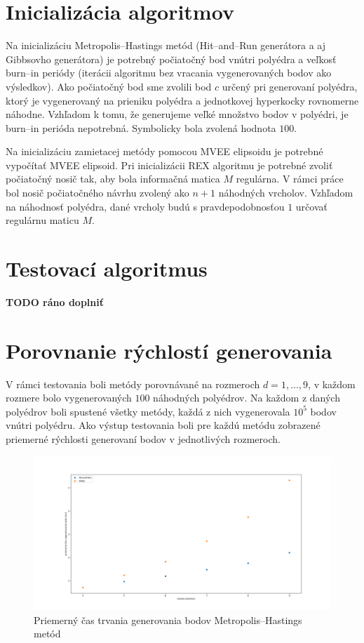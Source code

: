 \section{Inicializácia algoritmov}

Na inicializáciu Metropolis--Hastings metód (Hit--and--Run generátora a aj Gibbsovho generátora) je potrebný počiatočný bod vnútri polyédra a veľkosť burn--in periódy (iterácii algoritmu bez vracania vygenerovaných bodov ako výsledkov). Ako počiatočný bod sme zvolili bod $c$ určený pri generovaní polyédra, ktorý je vygenerovaný na prieniku polyédra a jednotkovej hyperkocky rovnomerne náhodne. Vzhľadom k tomu, že generujeme veľké množstvo bodov v polyédri, je burn--in perióda nepotrebná. Symbolicky bola zvolená hodnota $100$.

Na inicializáciu zamietacej metódy pomocou MVEE elipsoidu je potrebné vypočítať MVEE elipsoid. Pri inicializácii REX algoritmu je potrebné zvoliť počiatočný nosič tak, aby bola informačná matica $M$ regulárna. V rámci práce bol nosič počiatočného návrhu zvolený ako $n+1$ náhodných vrcholov. Vzhľadom na náhodnosť polyédra, dané vrcholy budú s pravdepodobnosťou $1$ určovať regulárnu maticu $M$.

\section{Testovací algoritmus}

\textbf{TODO ráno doplniť}

\section{Porovnanie rýchlostí generovania}

V rámci testovania boli metódy porovnávané na rozmeroch $d=1, \dots, 9$, v každom rozmere bolo vygenerovaných $100$ náhodných polyédrov. Na každom z daných polyédrov boli spustené všetky metódy, každá z nich vygenerovala $10^5$ bodov vnútri polyédru. Ako výstup testovania boli pre každú metódu zobrazené priemerné rýchlosti generovaní bodov v jednotlivých rozmeroch.\\

\begin{figure} [H]
  \includegraphics[width=\linewidth]{images/mh.png}
  \caption{Priemerný čas trvania generovania bodov Metropolis--Hastings metód}
  \label{fig:mh}
\end{figure}

